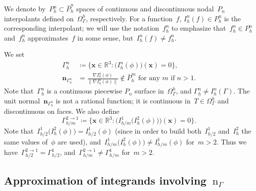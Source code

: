 \documentclass[12pt]{article}
\newcommand{\vect}[1]{\boldsymbol{\mathbf{#1}}}
\begin{document}
We denote by~$P_h^n \subset \bar P_h^n$ spaces of continuous and discontinuous nodal~$P_n$ interpolants defined on~$\Omega_\Gamma^h$, respectively. For a function~$f$, $I_h^n(f) \in P_h^n$ is the corresponding interpolant; we will use the notation~$f_h^n$ to emphasize that~$f_h^n \in P_h^n$ and~$f_h^n$ approximates~$f$ in some sense, but~$I_h^n(f) \ne f_h^n$.

We set
\begin{align}\label{gammah}
	\Gamma_h^n &\coloneqq \{ \vect x \in \mathbb{R}^3 : \big(I_h^n(\phi)\big)(\vect x) = 0 \}, \\
	\vect n_{\Gamma_h^n} &= \frac{\nabla I_h^n(\phi)}{\|\nabla I_h^n(\phi)\|} \not\in \bar{P}_h^m\text{ for any $m$ if $n > 1$}. \label{gammah:n}
\end{align}  
Note that~$\Gamma_h^n$ is a continuous piecewise $P_n$ surface in~$\Omega_\Gamma^h$, and $\Gamma_h^n \ne I_h^n(\Gamma)$. The unit normal~$\vect n_{\Gamma_h^n}$ is not a rational function; it is continuous in~$T \in \Omega_\Gamma^h$ and discontinuous on faces. We also define
\begin{equation}\label{gammah2}
	\Gamma_{h/m}^{2 \rightarrow 1} \coloneqq \{ \vect x \in \mathbb{R}^3 : \Big(I_{h/m}^1\big(I_h^2(\phi)\big)\Big)(\vect x) = 0 \}.
\end{equation}  
Note that~$I_{h/2}^1\big(I_{h}^2(\phi)\big) = I_{h/2}^1(\phi)$ (since in order to build both~$I_{h/2}^1$ and~$I_{h}^2$ the same values of~$\phi$ are used), and~$I_{h/m}^1\big(I_{h}^2(\phi)\big) \ne I_{h/m}^1(\phi)$ for~$m > 2$. Thus we have~$\Gamma_{h/2}^{2 \rightarrow 1} = \Gamma_{h/2}^1$, and~$\Gamma_{h/m}^{2 \rightarrow 1} \ne \Gamma_{h/m}^1$ for~$m > 2$.

\subsection{Approximation of integrands involving~$\text{n}_\Gamma$}\label{subsec:app}
\end{document}
